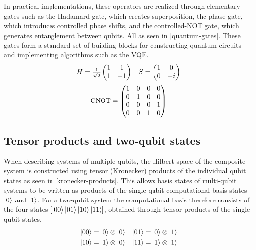 In practical implementations, these operators are realized through elementary gates such as the Hadamard gate, which creates superposition, the phase gate, which introduces controlled phase shifts, and the controlled-NOT gate, which generates entanglement between qubits. All as seen in \cref{quantum-gates}. These gates form a standard set of building blocks for constructing quantum circuits and implementing algorithms such as the VQE.
\begin{equation}\label{quantum-gates}
\begin{array}{cc}
H = \frac{1}{\sqrt{2}}
\begin{pmatrix}
1 & 1\\
1 & -1
\end{pmatrix}
&
S =
\begin{pmatrix}
1 & 0\\
0 & -i
\end{pmatrix}
\\[12pt]
\multicolumn{2}{c}{
\text{CNOT} =
\begin{pmatrix}
1 & 0 & 0 & 0\\
0 & 1 & 0 & 0\\
0 & 0 & 0 & 1\\
0 & 0 & 1 & 0
\end{pmatrix}}
\end{array}
\end{equation}

\subsection{Tensor products and two-qubit states}
When describing systems of multiple qubits, the Hilbert space of the composite system is constructed using tensor (Kronecker) products of the individual qubit states as seen in \cref{kronecker-products}. This allows basis states of multi-qubit systems to be written as products of the single-qubit computational basis states $\left| 0 \right\rangle$ and $\left| 1 \right\rangle$. For a two-qubit system the computational basis therefore consists of the four states $[\left| 00 \right\rangle\space\left| 01 \right\rangle\space\left| 10 \right\rangle\space\left| 11 \right\rangle]$, obtained through tensor products of the single-qubit states.
\begin{equation}\label{kronecker-products}
\begin{aligned}
\left| 00 \right\rangle &= \left| 0 \right\rangle \otimes \left| 0 \right\rangle &
\left| 01 \right\rangle &= \left| 0 \right\rangle \otimes \left| 1 \right\rangle \\
\left| 10 \right\rangle &= \left| 1 \right\rangle \otimes \left| 0 \right\rangle &
\left| 11 \right\rangle &= \left| 1 \right\rangle \otimes \left| 1 \right\rangle
\end{aligned}
\end{equation}

